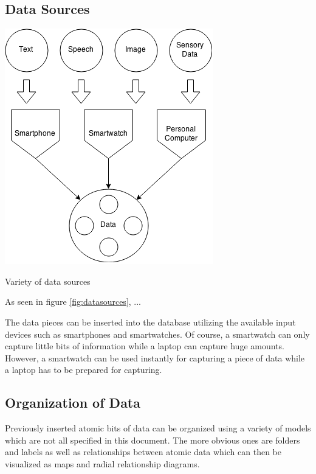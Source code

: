 \subsection{Data Sources}

\begin{flfigure}
  \centering
    \includegraphics[width=0.9\linewidth]{00_resources/input_methods.png}
    \caption{Variety of data sources}
  \label{fig:datasources}
\end{flfigure}

As seen in figure \ref{fig:datasources}, ...

The data pieces can be inserted into the database utilizing the available input devices such as smartphones and smartwatches. Of course, a smartwatch can only capture little bits of information while a laptop can capture huge amounts. However, a smartwatch can be used instantly for capturing a piece of data while a laptop has to be prepared for capturing.

\subsection{Organization of Data}
%
%

Previously inserted atomic bits of data can be organized using a variety of models which are not all specified in this document. The more obvious ones are folders and labels as well as relationships between atomic data which can then be visualized as maps and radial relationship diagrams.

